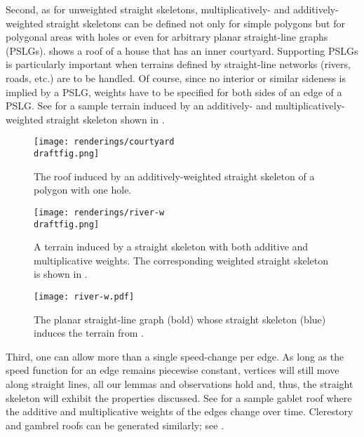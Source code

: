\documentclass[preprint]{elsarticle}
\newcommand{\draftfig}{.small}
\begin{document}
Second, as for unweighted straight skeletons, multiplicatively- and
additively-weighted straight skeletons can be defined not only for simple
polygons but for polygonal areas with holes or even for arbitrary planar
straight-line graphs (PSLGs).  shows a roof of a house
that has an inner courtyard. Supporting PSLGs is particularly important when
terrains defined by straight-line networks (rivers, roads, etc.) are to be
handled. Of course, since no interior or similar sideness is implied by a
PSLG, weights have to be specified for both sides of an edge of a PSLG.
See  for a sample terrain induced by an additively-
and multiplicatively-weighted straight skeleton shown in .

\begin{figure}[htb!]
  \centering
  \texttt{[image: renderings/courtyard\\draftfig.png]}
    \caption{The roof induced by an additively-weighted straight skeleton of a
       polygon with one hole.
     }
  \label{fig:courtyard}
\end{figure}

\begin{figure}[p]
  \centering

  \texttt{[image: renderings/river-w\\draftfig.png]}

  \caption{A terrain induced by a straight skeleton with both additive
    and multiplicative weights.  The corresponding weighted straight
    skeleton is shown in .  }
  \label{fig:terrain}

  \vspace{3ex}

  \texttt{[image: river-w.pdf]}

  \caption{The planar straight-line graph (bold) whose straight skeleton (blue)
    induces the terrain from .
  }
  \label{fig:terrain-sk}
\end{figure}

Third, one can allow more than a single speed-change per edge.  As long as the
speed function for an edge remains piecewise constant, vertices will still
move along straight lines, all our lemmas and observations hold and, thus, the
straight skeleton will exhibit the properties discussed. See
   for a sample gablet roof where the additive and
  multiplicative weights of the edges change over time. Clerestory and
gambrel roofs can be generated similarly; see .
\end{document}
